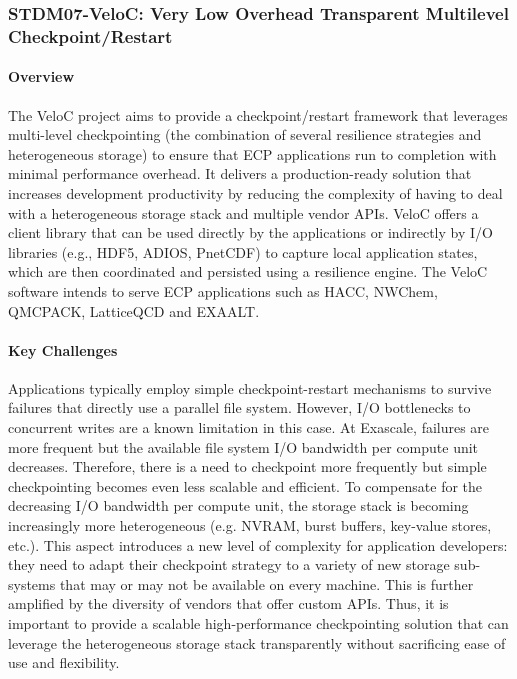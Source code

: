 \subsubsection{ STDM07-VeloC: Very Low Overhead Transparent Multilevel Checkpoint/Restart} 


\paragraph{Overview} 

The VeloC project aims to provide a checkpoint/restart framework that
leverages multi-level checkpointing (the combination of several
resilience strategies and heterogeneous storage) to ensure that ECP
applications run to completion with minimal performance overhead. It
delivers a production-ready solution that increases development
productivity by reducing the complexity of having to deal with a
heterogeneous storage stack and multiple vendor APIs. VeloC offers a
client library that can be used directly by the applications or
indirectly by I/O libraries (e.g., HDF5, ADIOS, PnetCDF) to capture
local application states, which are then coordinated and persisted
using a resilience engine. The VeloC software intends to serve ECP
applications such as HACC, NWChem, QMCPACK, LatticeQCD and EXAALT.

\paragraph{Key Challenges}

Applications typically employ simple checkpoint-restart mechanisms to
survive failures that directly use a parallel file system.  However,
I/O bottlenecks to concurrent writes are a known limitation in this
case. At Exascale, failures are more frequent but the available file
system I/O bandwidth per compute unit decreases. Therefore, there is a
need to checkpoint more frequently but simple checkpointing becomes
even less scalable and efficient. To compensate for the decreasing I/O
bandwidth per compute unit, the storage stack is becoming increasingly
more heterogeneous (e.g. NVRAM, burst buffers, key-value stores,
etc.). This aspect introduces a new level of complexity for
application developers: they need to adapt their checkpoint strategy
to a variety of new storage sub-systems that may or may not be
available on every machine. This is further amplified by the diversity
of vendors that offer custom APIs. Thus, it is important to provide
a scalable high-performance checkpointing solution that can leverage
the heterogeneous storage stack transparently without sacrificing
ease of use and flexibility.

